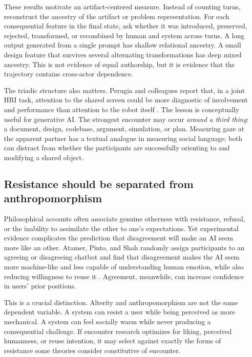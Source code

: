 \documentclass[11pt]{article}
\begin{document}
These results motivate an artifact-centered measure. Instead of counting turns, reconstruct the ancestry of the artifact or problem representation. For each consequential feature in the final state, ask whether it was introduced, preserved, rejected, transformed, or recombined by human and system across turns. A long output generated from a single prompt has shallow relational ancestry. A small design feature that survives several alternating transformations has deep mixed ancestry. This is not evidence of equal authorship, but it is evidence that the trajectory contains cross-actor dependence.

The triadic structure also matters. Perugia and colleagues report that, in a joint HRI task, attention to the shared screen could be more diagnostic of involvement and performance than attention to the robot itself \citep{PerugiaEtAl2021Eyes}. The lesson is conceptually useful for generative AI. The strongest encounter may occur \emph{around a third thing}: a document, design, codebase, argument, simulation, or plan. Measuring gaze at the apparent partner has a textual analogue in measuring social language; both can distract from whether the participants are successfully orienting to and modifying a shared object.

\subsection{Resistance should be separated from anthropomorphism}

Philosophical accounts often associate genuine otherness with resistance, refusal, or the inability to assimilate the other to one's expectations. Yet experimental evidence complicates the prediction that disagreement will make an AI seem more like an other. Atamer, Pinto, and Shah randomly assign participants to an agreeing or disagreeing chatbot and find that disagreement makes the AI seem more machine-like and less capable of understanding human emotion, while also reducing willingness to reuse it \citep{AtamerPintoShah2026Disagreement}. Agreement, meanwhile, can increase confidence in users' prior positions.

This is a crucial distinction. Alterity and anthropomorphism are not the same dependent variable. A system can resist a user while being perceived as more mechanical. A system can feel socially warm while never producing a consequential challenge. If encounter research optimizes for liking, perceived humanness, or reuse intention, it may select against exactly the forms of resistance some theories consider constitutive of encounter.
\end{document}
